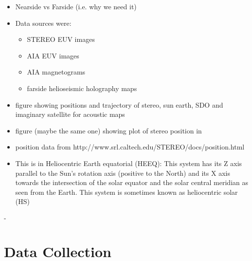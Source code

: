 \documentclass[11pt,a4paper,onecolumn]{report}
\begin{document}
\begin{itemize}
  \item Nearside vs Farside (i.e. why we need it)
  \item Data sources were:
        \begin{itemize}
          \item STEREO EUV images
          \item AIA EUV images
          \item AIA magnetograms
          \item farside helioseismic holography maps
        \end{itemize}
  \item figure showing positions and trajectory of stereo, sun earth, SDO and
        imaginary satellite for acoustic maps
  \item figure (maybe the same one) showing plot of stereo position in
  \item position data from http://www.srl.caltech.edu/STEREO/docs/position.html
  \item This is in Heliocentric Earth equatorial (HEEQ): This system has its Z
        axis parallel to the Sun's rotation axis (positive to the North) and its X
        axis towards the intersection of the solar equator and the solar central
        meridian as seen from the Earth. This system is sometimes known as
        heliocentric solar (HS)

\end{itemize}

-

\section{Data Collection}
\end{document}

